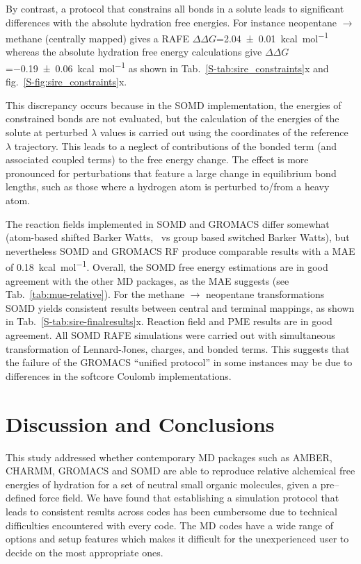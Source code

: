 \documentclass[journal=jctcce,manuscript=article]{achemso}
\begin{document}
By contrast, a protocol that constrains all bonds in a solute leads to
significant differences with the absolute hydration free energies. For instance
neopentane $\rightarrow$ methane (centrally mapped) gives a RAFE
$\Delta\Delta G$=\SI{2.04 +- 0.01}{kcal.mol^{-1}}  whereas the absolute
hydration free energy calculations give $\Delta\Delta
G$=\SI{-0.19+-0.06}{kcal.mol^{-1}} as shown in
Tab.~\ref{S-tab:sire_constraints}x and fig.~\ref{S-fig:sire_constraints}x.

This discrepancy occurs because in the SOMD implementation, the energies of constrained bonds are not evaluated, but the calculation of the energies of the solute at perturbed $\lambda$ values is carried out using the coordinates of the reference $\lambda$ trajectory. This leads to a neglect of contributions of
the bonded term (and associated coupled terms) to the free energy change. The effect is more pronounced for perturbations that feature a large change in equilibrium bond lengths, such as those where a hydrogen atom is perturbed
to/from a heavy atom.

The reaction fields implemented in SOMD and GROMACS differ somewhat (atom-based
shifted Barker Watts,~\cite{doi:10.1080/00268977300102101} vs group based switched Barker Watts), but nevertheless SOMD and GROMACS RF produce comparable results with a MAE of \SI{0.18}{kcal.mol^{-1}}. Overall, the SOMD free energy estimations are in good agreement with the other MD packages, as the MAE suggests (see Tab.~\ref{tab:mue-relative}). For the methane $\rightarrow$ neopentane transformations SOMD yields consistent results between central and terminal mappings, as shown in Tab.~\ref{S-tab:sire-finalresults}x.
Reaction field and PME results are in good agreement.  All SOMD RAFE simulations were carried out with simultaneous transformation of Lennard-Jones, charges, and bonded terms. This suggests that the failure of the GROMACS ``unified protocol'' in some instances may be due to differences in the softcore Coulomb implementations.


\section{Discussion and Conclusions}
\label{sec:discuss}

This study addressed whether contemporary MD packages such as AMBER, CHARMM, GROMACS and SOMD are able to reproduce relative alchemical free energies of hydration for a set of neutral small organic molecules, given a
pre--defined force field.
We have found that establishing a simulation protocol that leads to consistent results across codes has been cumbersome due to technical difficulties encountered with every code.  The MD codes have a wide range of options and setup features which makes it difficult for the unexperienced user to decide on the most
appropriate ones.
\end{document}
